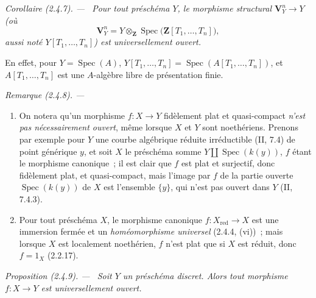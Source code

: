 \documentclass[10pt,oneside]{book}
\newenvironment{proposition}[1][]{%
  \par\medskip\noindent\itshape Proposition (#1). ---\ }{\par}
\newenvironment{corollary}[1][]{%
  \par\medskip\noindent\itshape Corollaire (#1). ---\ }{\par}
\newenvironment{remark}[1][]{%
  \par\medskip\noindent\itshape Remarque (#1). ---\ }{\par}
\begin{document}
\begin{corollary}[2.4.7]
\label{IV.2.4.7-fr}
Pour tout préschéma $Y$, le morphisme structural $\mathbf V_Y^n\to Y$ (où
\[
\mathbf V_Y^n
=Y\otimes_{\mathbf Z}\operatorname{Spec}
  \bigl(\mathbf Z[T_1,\ldots,T_n]\bigr),
\]
aussi noté $Y[T_1,\ldots,T_n]$) est universellement ouvert.
\end{corollary}

En effet, pour $Y=\operatorname{Spec}(A)$,
$Y[T_1,\ldots,T_n]=\operatorname{Spec}(A[T_1,\ldots,T_n])$, et
$A[T_1,\ldots,T_n]$ est une $A$-algèbre libre de présentation finie.

\begin{remark}[2.4.8]
\label{IV.2.4.8-fr}
\begin{enumerate}
\item[(i)] On notera qu'un morphisme $f:X\to Y$ fidèlement plat et
quasi-compact \emph{n'est pas nécessairement ouvert}, même lorsque $X$ et $Y$
sont noethériens. Prenons par exemple pour $Y$ une courbe algébrique réduite
irréductible (II, 7.4) de point générique $y$, et soit $X$ le préschéma somme
$Y\amalg\operatorname{Spec}(k(y))$, $f$ étant le morphisme canonique~; il est
clair que $f$ est plat et surjectif, donc fidèlement plat, et quasi-compact,
mais l'image par $f$ de la partie ouverte $\operatorname{Spec}(k(y))$ de $X$
est l'ensemble $\{y\}$, qui n'est pas ouvert dans $Y$ (II, 7.4.3).
\item[(ii)] Pour tout préschéma $X$, le morphisme canonique
$f:X_{\mathrm{red}}\to X$ est une immersion fermée et un
\emph{homéomorphisme universel} (2.4.4, (vi))~; mais lorsque $X$ est
localement noethérien, $f$ n'est plat que si $X$ est réduit, donc
$f=1_X$ (2.2.17).
\end{enumerate}
\end{remark}

\begin{proposition}[2.4.9]
\label{IV.2.4.9-fr}
Soit $Y$ un préschéma discret. Alors tout morphisme $f:X\to Y$ est
universellement ouvert.
\end{proposition}
\end{document}
